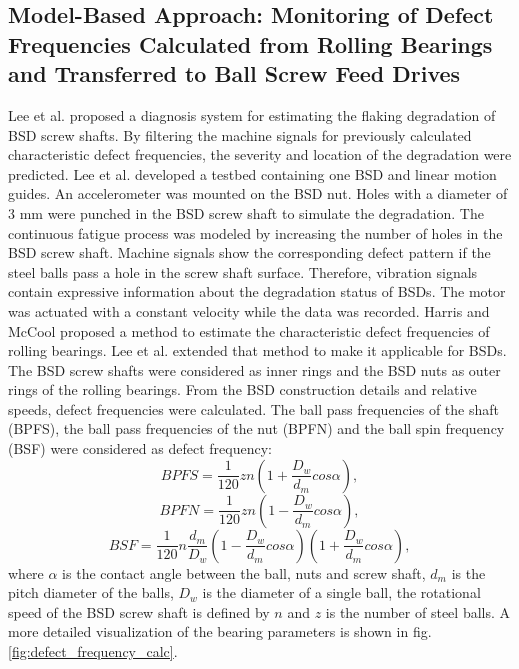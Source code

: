 \subsection{Model-Based Approach: Monitoring of Defect Frequencies Calculated from Rolling Bearings and Transferred to Ball Screw Feed Drives}
Lee et al. \cite{Lee2015} proposed a diagnosis system for estimating the flaking degradation of BSD screw shafts. By filtering the machine signals for previously calculated characteristic defect frequencies, the severity and location of the degradation were predicted. Lee et al. developed a testbed containing one BSD and linear motion guides. An accelerometer was mounted on the BSD nut. Holes with a diameter of 3 mm were punched in the BSD screw shaft to simulate the degradation. The continuous fatigue process was modeled by increasing the number of holes in the BSD screw shaft. Machine signals show the corresponding defect pattern if the steel balls pass a hole in the screw shaft surface. Therefore, vibration signals contain expressive information about the degradation status of BSDs. The motor was actuated with a constant velocity while the data was recorded. Harris and McCool \cite{Harris1996} proposed a method to estimate the characteristic defect frequencies of rolling bearings. Lee et al. \cite{Lee2015} extended that method to make it applicable for BSDs. The BSD screw shafts were considered as inner rings and the BSD nuts as outer rings of the rolling bearings. From the BSD construction details and relative speeds, defect frequencies were calculated. The ball pass frequencies of the shaft (BPFS), the ball pass frequencies of the nut (BPFN) and the ball spin frequency (BSF) were considered as defect frequency: 
\begin{equation}
    BPFS = \frac{1}{120}zn(1+\frac{D_{w}}{d_{m}}cos\alpha),
    \label{eq:defect_frequency}
\end{equation}
\begin{equation}
    BPFN = \frac{1}{120}zn(1-\frac{D_{w}}{d_{m}}cos\alpha),
\end{equation}
\begin{equation}
    BSF = \frac{1}{120}n\frac{d_{m}}{D_{w}} (1-\frac{D_{w}}{d_{m}}cos\alpha)(1+\frac{D_{w}}{d_{m}}cos\alpha) ,
\end{equation}
where $\alpha$ is the contact angle between the ball, nuts and screw shaft, $d_{m}$ is the pitch diameter of the balls, $D_{w}$ is the diameter of a single ball, the rotational speed of the BSD screw shaft is defined by $n$ and $z$ is the number of steel balls. A more detailed visualization of the bearing parameters is shown in fig. \ref{fig:defect_frequency_calc}. 

